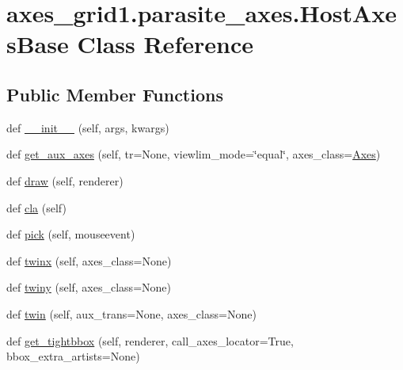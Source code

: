 \hypertarget{classaxes__grid1_1_1parasite__axes_1_1HostAxesBase}{}\section{axes\+\_\+grid1.\+parasite\+\_\+axes.\+Host\+Axes\+Base Class Reference}
\label{classaxes__grid1_1_1parasite__axes_1_1HostAxesBase}
\subsection*{Public Member Functions}
\begin{DoxyCompactItemize}
\item 
def \hyperlink{classaxes__grid1_1_1parasite__axes_1_1HostAxesBase_a1e72f13a79a19034f551f037ddb29eb0}{\+\_\+\+\_\+init\+\_\+\+\_\+} (self, args, kwargs)
\item 
def \hyperlink{classaxes__grid1_1_1parasite__axes_1_1HostAxesBase_a402259ddb9c3a8b080d076c6ea2dfdbd}{get\+\_\+aux\+\_\+axes} (self, tr=None, viewlim\+\_\+mode=\char`\"{}equal\char`\"{}, axes\+\_\+class=\hyperlink{classaxes__grid1_1_1mpl__axes_1_1Axes}{Axes})
\item 
def \hyperlink{classaxes__grid1_1_1parasite__axes_1_1HostAxesBase_a87aa95fed201a1b15244b50aa9b1c532}{draw} (self, renderer)
\item 
def \hyperlink{classaxes__grid1_1_1parasite__axes_1_1HostAxesBase_a144d0996bc8b36a3d6f050166f540d0e}{cla} (self)
\item 
def \hyperlink{classaxes__grid1_1_1parasite__axes_1_1HostAxesBase_a68bb93fa87e4edfcebdc08862e03dd28}{pick} (self, mouseevent)
\item 
def \hyperlink{classaxes__grid1_1_1parasite__axes_1_1HostAxesBase_a07479258b634124dcdaf0276b3fbcb37}{twinx} (self, axes\+\_\+class=None)
\item 
def \hyperlink{classaxes__grid1_1_1parasite__axes_1_1HostAxesBase_a473fb8cb8850ff806fe87a140bf8e6f7}{twiny} (self, axes\+\_\+class=None)
\item 
def \hyperlink{classaxes__grid1_1_1parasite__axes_1_1HostAxesBase_a470c7ca267b185d6e160147ad6cccbca}{twin} (self, aux\+\_\+trans=None, axes\+\_\+class=None)
\item 
def \hyperlink{classaxes__grid1_1_1parasite__axes_1_1HostAxesBase_afbdaab27b1dd240b2f2f4f69e155ea53}{get\+\_\+tightbbox} (self, renderer, call\+\_\+axes\+\_\+locator=True, bbox\+\_\+extra\+\_\+artists=None)
\end{DoxyCompactItemize}
